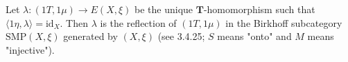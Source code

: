Let $\lambda: (1T, 1\mu) \longrightarrow E(X, \xi)$ be the unique $\mathbf{T}$-homomorphism such that $\langle 1\eta, \lambda \rangle = \mathrm{id}_X$. Then $\lambda$ is the reflection of $(1T, 1\mu)$ in the Birkhoff subcategory $\mathrm{SMP}(X, \xi)$ generated by $(X, \xi)$ (see 3.4.25; $S$ means "onto" and $M$ means "injective").
